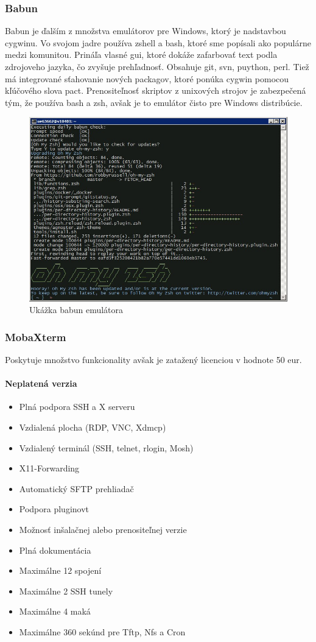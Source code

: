 \subsubsection{Babun}
\indent Babun je ďalším z množstva emulátorov pre Windows, ktorý je nadstavbou cygwinu. Vo svojom jadre používa zshell a bash, ktoré sme popísali ako populárne medzi komunitou. Prináľa vlasné gui, ktoré dokáže zafarbovať text podla zdrojoveho jazyka, čo zvyšuje prehľadnosť. Obsahuje git, svn, puython, perl. Tiež má integrované sťahovanie nových packagov, ktoré ponúka cygwin pomocou kľúčového slova pact. Prenositeľnosť skriptov z unixových strojov je zabezpečená tým, že používa bash a zsh, avšak je to emulátor čisto pre Windows distribúcie.\cite{babun}
\begin{figure}[!htbp]
	\centering
	\includegraphics[scale=0.4]{img/babun.jpeg}
	\caption{Ukážka babun emulátora}
	\label{fig:test}
\end{figure}
\subsubsection{MobaXterm}
\indent Poskytuje množstvo funkcionality avšak je zatažený licenciou v hodnote 50 eur. \cite{mobaxterm}
\paragraph{Neplatená verzia}
\begin{itemize}
	\item Plná podpora SSH a X serveru
	\item Vzdialená plocha (RDP, VNC, Xdmcp)
	\item Vzdialený terminál (SSH, telnet, rlogin, Mosh)
	\item X11-Forwarding
	\item Automatický SFTP prehliadač
	\item Podpora pluginovt
	\item Možnosť inšalačnej alebo prenositeľnej verzie
	\item Plná dokumentácia
	\item Maximálne 12 spojení
	\item Maximálne 2 SSH tunely
	\item Maximálne 4 maká
	\item Maximálne 360 sekúnd pre Tftp, Nfs a Cron
\end{itemize}

